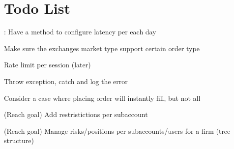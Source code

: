 \chapter{Todo List}
\hypertarget{todo}{}\label{todo}

\begin{DoxyRefList}
\item[Class \doxylink{class_exchange}{Exchange} ]\label{todo__todo000004}%
%
\+: Have a method to configure latency per each day  
\item[Class \doxylink{class_order}{Order} ]\label{todo__todo000001}%
%
Make sure the exchange\textquotesingle{}s market type support certain order type 



Rate limit per session (later) 



Throw exception, catch and log the error  
\item[Global \doxylink{class_order_book_a95387368053c1012225455fb5b9b6835}{Order\+Book\+::add\+Order} (double price\+\_\+level, int order\+\_\+side, double order\+\_\+size, std\+::shared\+\_\+ptr$<$ Order $>$ order\+\_\+ptr)]\label{todo__todo000002}%
%
Consider a case where placing order will instantly fill, but not all  
\item[Class \doxylink{class_user}{User} ]\label{todo__todo000003}%
%
(Reach goal) Add restristictions per subaccount 



(Reach goal) Manage risks/positions per subaccounts/users for a firm (tree structure) 
\end{DoxyRefList}
